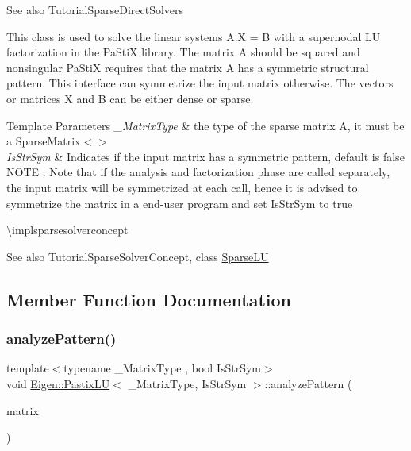 \begin{DoxySeeAlso}{See also}
Tutorial\+Sparse\+Direct\+Solvers
\end{DoxySeeAlso}
This class is used to solve the linear systems A.\+X = B with a supernodal LU factorization in the Pa\+StiX library. The matrix A should be squared and nonsingular Pa\+StiX requires that the matrix A has a symmetric structural pattern. This interface can symmetrize the input matrix otherwise. The vectors or matrices X and B can be either dense or sparse.


\begin{DoxyTemplParams}{Template Parameters}
{\em \+\_\+\+Matrix\+Type} & the type of the sparse matrix A, it must be a Sparse\+Matrix$<$$>$ \\
\hline
{\em Is\+Str\+Sym} & Indicates if the input matrix has a symmetric pattern, default is false N\+O\+TE \+: Note that if the analysis and factorization phase are called separately, the input matrix will be symmetrized at each call, hence it is advised to symmetrize the matrix in a end-\/user program and set {\ttfamily Is\+Str\+Sym} to true\\
\hline
\end{DoxyTemplParams}
\textbackslash{}implsparsesolverconcept

\begin{DoxySeeAlso}{See also}
Tutorial\+Sparse\+Solver\+Concept, class \mbox{\hyperlink{class_eigen_1_1_sparse_l_u}{Sparse\+LU}} 
\end{DoxySeeAlso}


\subsection{Member Function Documentation}
\mbox{\label{class_eigen_1_1_pastix_l_u_abae3ca7f1254106d9e2d5e0f273189fa}} 
\subsubsection{\texorpdfstring{analyzePattern()}{analyzePattern()}}
{\footnotesize\ttfamily template$<$typename \+\_\+\+Matrix\+Type , bool Is\+Str\+Sym$>$ \\
void \mbox{\hyperlink{class_eigen_1_1_pastix_l_u}{Eigen\+::\+Pastix\+LU}}$<$ \+\_\+\+Matrix\+Type, Is\+Str\+Sym $>$\+::analyze\+Pattern (\begin{DoxyParamCaption}\item[{const Matrix\+Type \&}]{matrix }\end{DoxyParamCaption})\hspace{0.3cm}{\ttfamily [inline]}}

